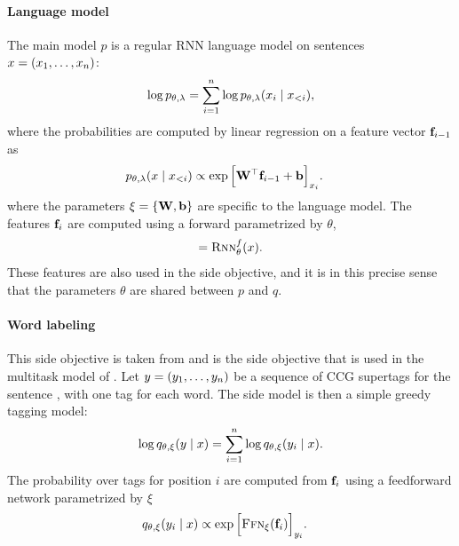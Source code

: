 \paragraph{Language model}
The main model $p$ is a regular RNN language model on sentences $x = (x_1, \dots, x_n)$:
\begin{align*}
  \log p_{\theta, \lambda} = \sum_{i=1}^n \log p_{\theta, \lambda}(x_i \mid x_{<i}),
\end{align*}
where the probabilities are computed by linear regression on a feature vector $\mathbf{f}_{i-1}$ as
\begin{align*}
  p_{\theta, \lambda}( x \mid x_{<i}) &\propto \exp \Big[ \mathbf{W}^{\top} \mathbf{f}_{i-1} + \mathbf{b} \Big]_{x_i}.
\end{align*}
where the parameters $\xi = \{ \mathbf{W}, \mathbf{b} \}$ are specific to the language model. The features $\mathbf{f}_i$ are computed using a forward \rnn parametrized by $\theta$,
\begin{align*}
  [ \fw_1, \dots, \fw_n ] = \rnn_{\theta}^f( \x ).
\end{align*}
These features are also used in the side objective, and it is in this precise sense that the parameters $\theta$ are shared between $p$ and $q$.

\paragraph{Word labeling}
This side objective is taken from \citet{enguehard2017multitask} and is the side objective that is used in the multitask model of \citet{linzen2018targeted}. Let $y = ( y_1, \dots, y_n )$ be a sequence of CCG supertags for the sentence \x, with one tag for each word. The side model is then a simple greedy tagging model:
\begin{align*}
  \log q_{\theta, \xi}(y \mid x)
    &= \sum_{i=1}^n \log q_{\theta, \xi}( y_i \mid x).  \\
\end{align*}
The probability over tags for position $i$ are computed from $\mathbf{f}_i$ using a feedforward network parametrized by $\xi$
\begin{align*}
  q_{\theta, \xi}( y_i \mid x) &\propto \exp \Big[ \textsc{Ffn}_{\xi}( \mathbf{f}_{i} ) \Big]_{y_i}.
\end{align*}

